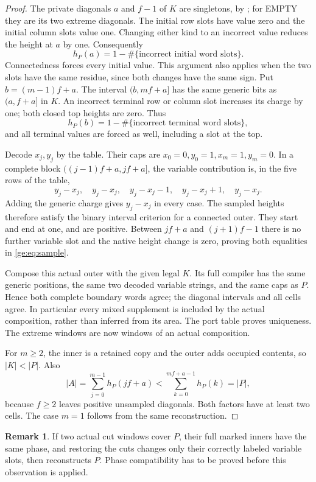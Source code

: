\documentclass[11pt,a4paper]{amsart}
\numberwithin{equation}{section}
\theoremstyle{plain}
\theoremstyle{definition}
\newtheorem{remark}[theorem]{Remark}
\begin{document}
\begin{proof}
The private diagonals \(a\) and \(f-1\) of \(K\) are singletons, by
; for EMPTY they
are its two extreme diagonals.  The initial row slots have value zero
and the initial column slots value one.  Changing either kind to an
incorrect value reduces the height at \(a\) by one.  Consequently
\[
 h_P(a)=1-\#\{\text{incorrect initial word slots}\}.
\]
Connectedness forces every initial value.  This argument also applies when
the two slots have the same residue, since both changes have the same
sign.  Put \(b=(m-1)f+a\).  The interval \((b,mf+a]\) has the same
generic bits as \((a,f+a]\) in \(K\).  An incorrect terminal row or
column slot increases its charge by one; both closed top heights are zero.
Thus
\[
 h_P(b)=1-\#\{\text{incorrect terminal word slots}\},
\]
and all terminal values are forced as well, including a slot at the top.

Decode \(x_j,y_j\) by the table.  Their caps are
\(x_0=0,y_0=1,x_m=1,y_m=0\).  In a complete block
\(((j-1)f+a,jf+a]\), the variable contribution is, in the five rows of
the table,
\[
 y_j-x_j,\quad y_j-x_j,\quad y_j-x_j-1,
 \quad y_j-x_j+1,\quad y_j-x_j.
\]
Adding the generic charge gives \(y_j-x_j\) in every case.  The sampled
heights therefore satisfy the binary interval criterion for a connected
outer.  They start and end at one, and are positive.  Between \(jf+a\)
and \((j+1)f-1\) there is no further variable slot and the native height
change is zero, proving both equalities in \eqref{ge:eq:sample}.

Compose this actual outer with the given legal \(K\).  Its full compiler
has the same generic positions, the same two decoded variable strings,
and the same caps as \(P\).  Hence both complete boundary words agree;
the diagonal intervals and all cells agree.  In particular every mixed
supplement is included by the actual composition, rather than inferred
from its area.  The port table proves uniqueness.  The extreme windows
are now windows of an actual composition.

For \(m\ge2\), the inner is a retained copy and the outer adds occupied
contents, so \(|K|<|P|\).  Also
\[
 |A|=\sum_{j=0}^{m-1}h_P(jf+a)<\sum_{k=0}^{mf+a-1}h_P(k)=|P|,
\]
because \(f\ge2\) leaves positive unsampled diagonals.  Both factors have
at least two cells.  The case \(m=1\) follows from the same reconstruction.
\end{proof}

\begin{remark}\label{ge:remark:cut}
If two actual cut windows cover \(P\), their full marked inners have the
same phase, and restoring the cuts changes only their correctly labeled
variable slots, then  reconstructs \(P\).  Phase
compatibility has to be proved before this observation is applied.
\end{remark}
\end{document}
